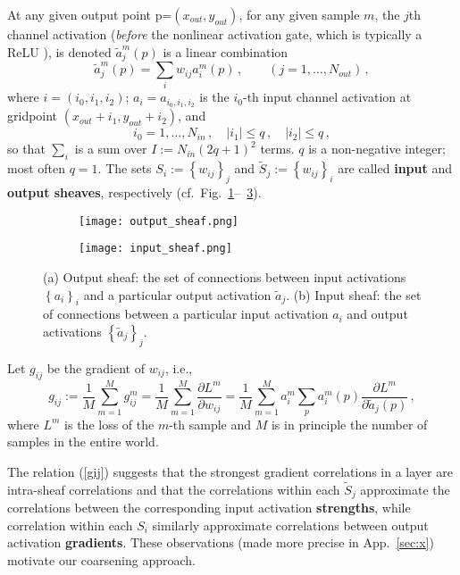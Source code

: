 \documentclass{article} %
\begin{document}
At any given output point p=$(x_{out}, y_{out})$, for any given sample $m$, the $j$th channel activation ({\it before} the nonlinear activation gate, which is typically a ReLU \cite{Goodfellow-et-al-2016}), is denoted $\tilde{a}^m_j(p)$ is a linear combination
\begin{equation}
    \tilde{a}^m_j(p) = \sum_i w_{ij} a^m_i(p)\,,\qquad (j = 1, \dots, N_{out})\,,
    \label{tilde_aj}
\end{equation}
where $i = (i_0, i_1, i_2)$; $a_i = a_{i_0,i_1,i_2}$ is the $i_0$-th input channel activation at gridpoint $(x_{out}+i_1, y_{out}+i_2)$, and
$$
	i_0 = 1, \dots, N_{in}\,, \quad |i_1|\leq q\,,\quad |i_2| \leq q\,,
$$
so that $\sum_i$ is a sum over $I := N_{in} (2 q + 1)^2$ terms. $q$ is a non-negative integer; most often $q = 1$. The sets $S_i := \left\{w_{ij}\right\}_j$ and
$\tilde{S}_j := \left\{w_{ij}\right\}_i$ are called \textbf{input} and \textbf{output sheaves}, respectively (cf.~Fig.~\ref{fig:input_sheaf}--~\ref{fig:output_sheaf}).
\begin{figure}[htbp]
\centering
\begin{subfigure}[b]{0.55\textwidth}
  \texttt{[image: output\_sheaf.png]}
   \caption{}
   \label{fig:input_sheaf} 
\end{subfigure}

\begin{subfigure}[b]{0.55\textwidth}
  \texttt{[image: input\_sheaf.png]}
   \caption{}
   \label{fig:output_sheaf}
\end{subfigure}
\caption[Sheaves.]{(a) Output sheaf: the set of connections between input activations $\left\{a_i\right\}_i$ and a particular output activation $\tilde{a}_j$. (b) Input sheaf: the set of connections between a particular input activation $a_i$ and output activations $\left\{\tilde{a}_j\right\}_j$.}
\end{figure}
Let $g_{ij}$ be the gradient of $w_{ij}$, i.e.,
\begin{equation}
	g_{ij} := \frac{1}{M} \sum_{m=1}^M g^m_{ij} = 
	\frac{1}{M} \sum_{m=1}^M \frac{\partial L^m}{\partial w_{ij}} =
	\frac{1}{M} \sum_{m=1}^M a^m_i \sum_p a^m_i(p) \frac{\partial L^m}{\partial \tilde{a}_j(p)}\,,
	\label{gij}
\end{equation}
where $L^m$ is the loss of the $m$-th sample and $M$ is in principle the number of samples in the entire world. 

The relation (\ref{gij}) suggests that the strongest gradient correlations in a layer are intra-sheaf correlations and that the correlations within each $\tilde{S}_j$ approximate the correlations between the corresponding input activation \textbf{strengths}, while correlation within each $S_i$ similarly approximate correlations between output activation \textbf{gradients}. These observations (made more precise in App.~\ref{sec:x}) motivate our coarsening approach.
\end{document}
